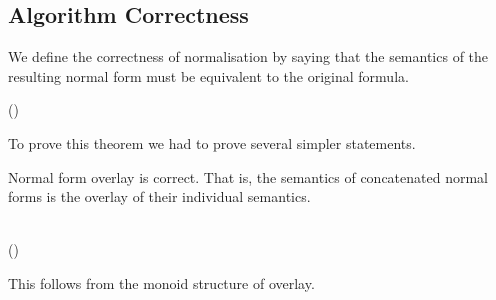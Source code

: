 \subsection{Algorithm Correctness}
We define the correctness of normalisation by saying that the semantics of the resulting normal form must be equivalent to the original formula.
\begin{hscode}\SaveRestoreHook
{}%
%
%
\>[3]{}\;\mathbin{:}\;\;\;\;\;\;\;(\;){}\<[E]%
\ColumnHook
\end{hscode}\resethooks

To prove this theorem we had to prove several simpler statements.

Normal form overlay is correct.
That is, the semantics of concatenated normal forms is the overlay of their individual semantics.
\begin{hscode}\SaveRestoreHook
{}%
%
%
\>[B]{}\;\mathbin{:}\;\;\;\;\;{}\<[E]%
\\
\>[B]{}\<[4]%
\>[4]{}\;\;\C{+}\;\;\;\;\;(\;\;){}\<[E]%
\ColumnHook
\end{hscode}\resethooks
This follows from the monoid structure of overlay.


